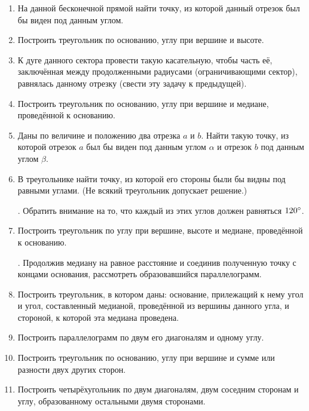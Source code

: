 \documentclass[oneside]{book}
\begin{document}
\begin{enumerate}[resume]

 \item
На данной бесконечной прямой найти точку, из которой данный отрезок был бы виден под данным углом.

 \item
Построить треугольник по основанию, углу при вершине и высоте.

 \item
К дуге данного сектора провести такую касательную, чтобы часть её, заключённая между продолженными радиусами (ограничивающими сектор), равнялась данному отрезку (свести эту задачу к предыдущей).

 \item
Построить треугольник по основанию, углу при вершине и медиане, проведённой к основанию.

 \item
Даны по величине и положению два отрезка $a$ и $b$.
Найти такую точку, из которой отрезок $a$ был бы виден под данным углом $\alpha$ и отрезок $b$ под данным углом $\beta$.

 \item
В треугольнике найти точку, из которой его стороны были бы видны под равными углами.
(Не всякий треугольник допускает решение.)

\smallskip
{}.
Обратить внимание на то, что каждый из этих углов должен равняться $120\degree$.

 \item
Построить треугольник по углу при вершине, высоте и медиане, проведённой к основанию.

\smallskip
{}.
Продолжив медиану на равное расстояние и соединив полученную точку с концами основания, рассмотреть образовавшийся параллелограмм.

 \item
Построить треугольник, в котором даны:
основание, прилежащий к нему угол и угол, составленный медианой, проведённой из вершины данного угла, и стороной, к которой эта медиана проведена.

 \item
Построить параллелограмм по двум его диагоналям и одному углу.

 \item
Построить треугольник по основанию, углу при вершине и сумме или разности двух других сторон.

 \item
Построить четырёхугольник по двум диагоналям, двум соседним сторонам и углу, образованному остальными двумя сторонами.


\end{enumerate}
\end{document}
